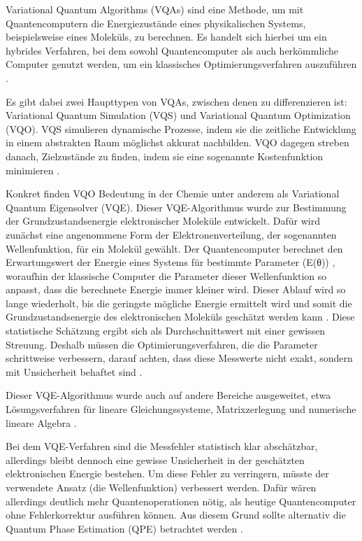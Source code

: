 Variational Quantum Algorithms (VQAs) sind eine Methode, um mit Quantencomputern die Energiezustände eines physikalischen Systems, beispielsweise eines Moleküls, zu berechnen. Es handelt sich hierbei um ein hybrides Verfahren, bei dem sowohl Quantencomputer als auch herkömmliche Computer genutzt werden, um ein klassisches Optimierungsverfahren auszuführen \citealp[6]{weidmanQuantumComputingChemistry2024a}.

Es gibt dabei zwei Haupttypen von VQAs, zwischen denen zu differenzieren ist: Variational Quantum Simulation (VQS) und Variational Quantum Optimization (VQO). VQS simulieren dynamische Prozesse, indem sie die zeitliche Entwicklung in einem abstrakten Raum möglichst akkurat nachbilden. VQO dagegen streben danach, Zielzustände zu finden, indem sie eine sogenannte Kostenfunktion minimieren \citealp[23]{mottaEmergingQuantumComputing2022}.

Konkret finden VQO Bedeutung in der Chemie unter anderem als Variational Quantum Eigensolver (VQE). Dieser VQE-Algorithmus wurde zur Bestimmung der Grundzustandsenergie elektronischer Moleküle entwickelt. Dafür wird zunächst eine angenommene Form der Elektronenverteilung, der sogenannten Wellenfunktion, für ein Molekül gewählt. Der Quantencomputer berechnet den Erwartungswert der Energie eines Systems für bestimmte Parameter (E(θ)) \citealp[23]{mottaEmergingQuantumComputing2022}, woraufhin der klassische Computer die Parameter dieser Wellenfunktion so anpasst, dass die berechnete Energie immer kleiner wird. Dieser Ablauf wird so lange wiederholt, bis die geringste mögliche Energie ermittelt wird und somit die Grundzustandsenergie des elektronischen Moleküls geschätzt werden kann \citealp[6]{weidmanQuantumComputingChemistry2024a}.
Diese statistische Schätzung ergibt sich als Durchschnittswert mit einer gewissen Streuung. Deshalb müssen die Optimierungsverfahren, die die Parameter schrittweise verbessern, darauf achten, dass diese Messwerte nicht exakt, sondern mit Unsicherheit behaftet sind \citealp[23]{mottaEmergingQuantumComputing2022}.

Dieser VQE-Algorithmus wurde auch auf andere Bereiche ausgeweitet, etwa Lösungsverfahren für lineare Gleichungssysteme, Matrixzerlegung und numerische lineare Algebra \citealp[6]{weidmanQuantumComputingChemistry2024a}.

Bei dem VQE-Verfahren sind die Messfehler statistisch klar abschätzbar, allerdings bleibt dennoch eine gewisse Unsicherheit in der geschätzten elektronischen Energie bestehen. Um diese Fehler zu verringern, müsste der verwendete Ansatz (die Wellenfunktion) verbessert werden. Dafür wären allerdings deutlich mehr Quantenoperationen nötig, als heutige Quantencomputer ohne Fehlerkorrektur ausführen können. Aus diesem Grund sollte alternativ die Quantum Phase Estimation (QPE) betrachtet werden \citealp[7]{vonburgQuantumComputingEnhanced2021}.



